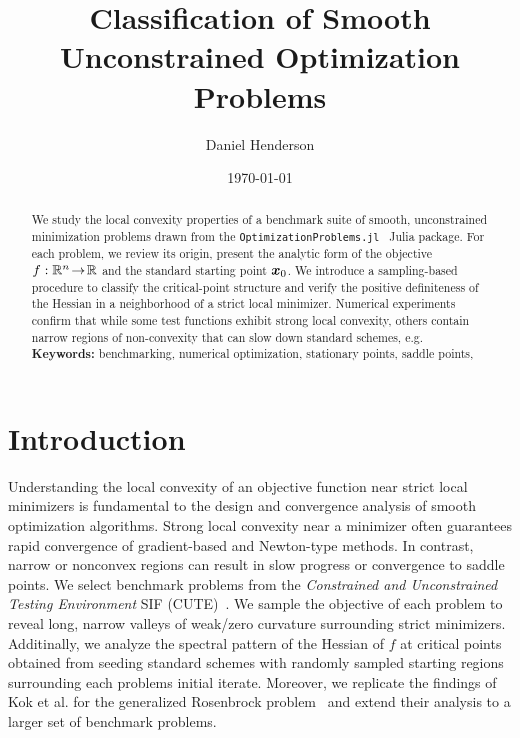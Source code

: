 \documentclass[10pt]{article}
\title{Classification of Smooth Unconstrained Optimization Problems}
\author{Daniel Henderson}
\date{\today}
\begin{document}
\maketitle

\begin{abstract}
    \noindent
    We study the local convexity properties of a benchmark suite of smooth, 
    unconstrained minimization problems drawn from the 
    \texttt{OptimizationProblems.jl}~\cite{OptimizationProblems} Julia package.
    For each problem, we review its origin, present the analytic form
    of the objective $f:\mathbb{R}^n\!\to\!\mathbb{R}$ and the standard starting point
    $\bm{x}_0$.  We introduce a sampling-based procedure to classify
    the critical-point structure and verify the positive definiteness of
    the Hessian in a neighborhood of a strict local minimizer.  Numerical
    experiments confirm that while some test functions exhibit strong
    local convexity, others contain narrow regions of non-convexity that
    can slow down standard schemes, e.g. 
    \noindent\textbf{Keywords:} benchmarking, numerical optimization, stationary points, saddle points,
\end{abstract}



\tableofcontents
\newpage


\section{Introduction}
    \label{sec:intro}
    \medskip

    Understanding the local convexity of an objective function
    near strict local minimizers is fundamental to the design 
    and convergence analysis of smooth optimization algorithms. 
    Strong local convexity near a minimizer often guarantees rapid 
    convergence of gradient-based and Newton-type methods. In 
    contrast, narrow or nonconvex regions can result in slow progress 
    or convergence to saddle points. We select benchmark problems from the
    \emph{Constrained and Unconstrained Testing Environment} SIF (CUTE)~\cite{CUTE}.
    We sample the objective of each problem to reveal long, 
    narrow valleys of weak/zero curvature surrounding strict minimizers.
    Additinally, we analyze the spectral pattern of the Hessian of $f$ at
    critical points obtained from seeding standard schemes with randomly
    sampled starting regions surrounding each problems initial iterate.
    Moreover, we replicate the findings of Kok et al. for the generalized
    Rosenbrock problem~\cite{Kok2009} and extend their analysis to 
    a larger set of benchmark problems.
  
\end{document}
